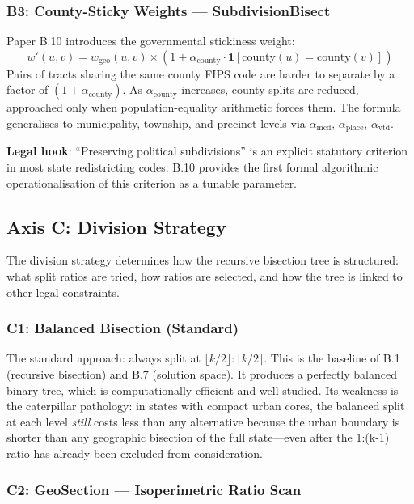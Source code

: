 \subsubsection*{B3: County-Sticky Weights --- SubdivisionBisect}

Paper B.10 introduces the governmental stickiness weight:
\[
  w'(u,v) = w_\text{geo}(u,v) \times (1 + \alpha_\text{county} \cdot \mathbf{1}[\text{county}(u) = \text{county}(v)])
\]
Pairs of tracts sharing the same county FIPS code are harder to separate by
a factor of $(1 + \alpha_\text{county})$.
As $\alpha_\text{county}$ increases, county splits are reduced, approached
only when population-equality arithmetic forces them.
The formula generalises to municipality, township, and precinct levels via
$\alpha_\text{mcd}$, $\alpha_\text{place}$, $\alpha_\text{vtd}$.

\textbf{Legal hook}: ``Preserving political subdivisions'' is an explicit
statutory criterion in most state redistricting codes.
B.10 provides the first formal algorithmic operationalisation of this criterion
as a tunable parameter.

\subsection{Axis C: Division Strategy}

The division strategy determines how the recursive bisection tree is structured:
what split ratios are tried, how ratios are selected, and how the tree is
linked to other legal constraints.

\subsubsection*{C1: Balanced Bisection (Standard)}

The standard approach: always split at $\lfloor k/2 \rfloor : \lceil k/2 \rceil$.
This is the baseline of B.1 (recursive bisection) and B.7 (solution space).
It produces a perfectly balanced binary tree, which is computationally efficient
and well-studied.
Its weakness is the caterpillar pathology: in states with compact urban cores,
the balanced split at each level \emph{still} costs less than any alternative
because the urban boundary is shorter than any geographic bisection of the full
state---even after the 1:(k-1) ratio has already been excluded from consideration.

\subsubsection*{C2: GeoSection --- Isoperimetric Ratio Scan}

